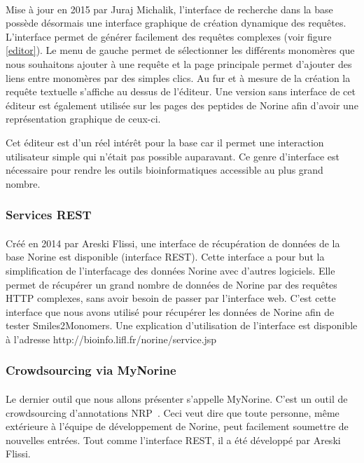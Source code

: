 \documentclass[12pt,french,twoside]{report}
\begin{document}
\paragraph{}Mise à jour en 2015 par Juraj Michalik, l'interface de recherche dans la base possède désormais une interface graphique de création dynamique des requêtes.
L'interface permet de générer facilement des requêtes complexes (voir figure \ref{editor}).
Le menu de gauche permet de sélectionner les différents monomères que nous souhaitons ajouter à une requête et la page principale permet d'ajouter des liens entre monomères par des simples clics.
Au fur et à mesure de la création la requête textuelle s'affiche au dessus de l'éditeur.
Une version sans interface de cet éditeur est également utilisée sur les pages des peptides de Norine afin d'avoir une représentation graphique de ceux-ci.

Cet éditeur est d'un réel intérêt pour la base car il permet une interaction utilisateur simple qui n'était pas possible auparavant.
Ce genre d'interface est nécessaire pour rendre les outils bioinformatiques accessible au plus grand nombre.



\subsubsection{Services REST}

\paragraph{}Créé en 2014 par Areski Flissi, une interface de récupération de données de la base Norine est disponible (interface REST).
Cette interface a pour but la simplification de l'interfacage des données Norine avec d'autres logiciels.
Elle permet de récupérer un grand nombre de données de Norine par des requêtes HTTP complexes, sans avoir besoin de passer par l'interface web.
C'est cette interface que nous avons utilisé pour récupérer les données de Norine afin de tester Smiles2Monomers.
Une explication d'utilisation de l'interface est disponible à l'adresse http://bioinfo.lifl.fr/norine/service.jsp



\subsubsection{Crowdsourcing via MyNorine}

\paragraph{}Le dernier outil que nous allons présenter s'appelle MyNorine.
C'est un outil de crowdsourcing d'annotations NRP~\cite{flissi_norine_2016}.
Ceci veut dire que toute personne, même extérieure à l'équipe de développement de Norine, peut facilement soumettre de nouvelles entrées.
Tout comme l'interface REST, il a été développé par Areski Flissi.
\end{document}
